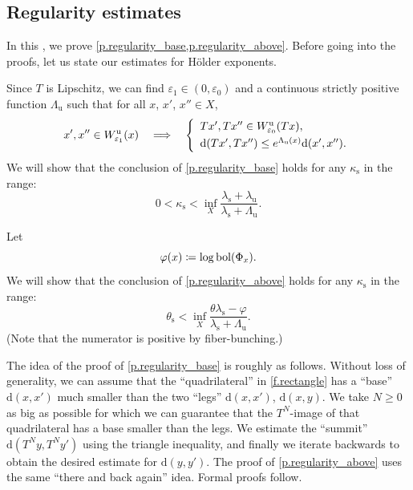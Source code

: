 \documentclass[JEP,XML,SOM,Unicode]{cedram}
\def\vcentcolon{\mathrel{\mathop\ordinarycolon}}
\providecommand\ordinarycolon{:}
\providecommand*\coloneqq{\vcentcolon\mathrel{\mkern-1.2mu}=}
\newcommand\implique{\mathchoice{\Longrightarrow}{\Rightarrow}{\Rightarrow}{\Rightarrow}}
\theoremstyle{plain}
\theoremstyle{definition}
\newcommand{\dd}{\mathrm{d}}
\newcommand{\uu}{\mathrm{u}}
\renewcommand{\ss}{\mathrm{s}}
\DeclareMathOperator{\bol}{bol}
\let\epsilon\varepsilon
\let\phi\varphi
\begin{document}
\subsection{Regularity estimates}\label{ss.regularity}

In this , we prove \cref{p.regularity_base,p.regularity_above}.
Before going into the proofs, let us state our estimates for Hölder exponents.

Since $T$ is Lipschitz, we can find $\epsilon_1 \in (0,\epsilon_0)$ and a continuous strictly positive function $\Lambda_\uu$ such that for all $x$, $x'$, $x''\in X$,
\begin{equation}\label{e.Lambda_u}
x',x''\in W^\uu_{\epsilon_1}(x) \quad \implique \quad
\left\{
\begin{array}{l}
	Tx', Tx'' \in W^\uu_{\epsilon_0}(Tx), \\[3pt]
	\dd(Tx', Tx'') \le e^{\Lambda_\uu(x)} \dd(x', x'').
\end{array}
\right.
\end{equation}
We will show that the conclusion of \cref{p.regularity_base} holds for any $\kappa_\ss$ in the range:
\begin{equation}\label{e.regularity_estimate_base}
0 < \kappa_{\ss} < \inf_{X} \frac{\lambda_\ss+\lambda_\uu}{\lambda_\ss+\Lambda_\uu}.
\end{equation}

Let
\begin{equation}\label{e.def_phi}
\phi(x) \coloneqq \log \bol(\Phi_x).
\end{equation}
We will show that the conclusion of \cref{p.regularity_above} holds for any $\kappa_\ss$ in the range:
\begin{equation}\label{e.regularity_estimate_above}
\theta_{\ss} < \inf_{X} \frac{\theta \lambda_\ss - \phi}{\lambda_\ss+\Lambda_\uu}.
\end{equation}
(Note that the numerator is positive by fiber-bunching.)

The idea of the proof of \cref{p.regularity_base} is roughly as follows.
Without loss of generality, we can assume that the ``quadrilateral'' in \cref{f.rectangle} has a ``base'' $\dd(x,x')$ much smaller than the two ``legs'' $\dd(x,x')$, $\dd(x,y)$.
We take $N \ge 0$ as big as possible for which we can guarantee that the $T^N$-image of that quadrilateral has a base smaller than the legs.
We estimate the ``summit'' $\dd(T^N y, T^N y')$ using the triangle inequality, and finally we iterate backwards to obtain the desired estimate for $\dd(y, y')$.
The proof of \cref{p.regularity_above} uses the same ``there and back again'' idea.
Formal proofs follow.
\end{document}
